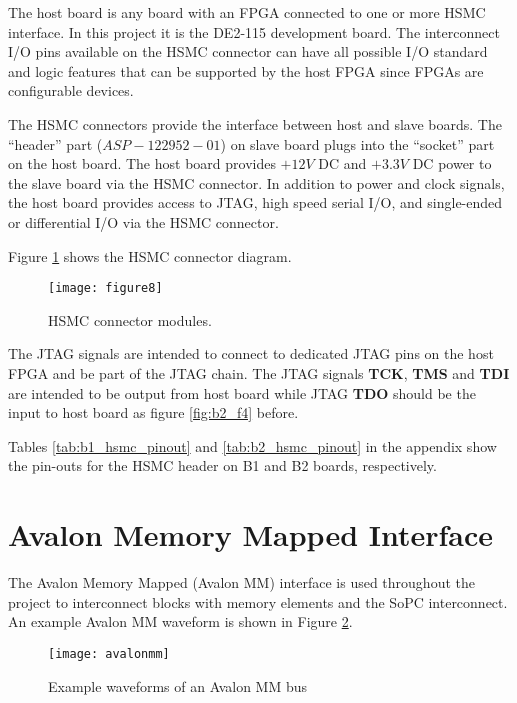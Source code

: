 The host board is any board with an FPGA connected to one or more HSMC interface. In this project it is the DE2-115 development board.
The interconnect I/O pins available on the HSMC connector can have all possible I/O standard and
logic features that can be supported by the host FPGA since FPGAs are configurable devices.

The HSMC connectors provide the interface between host and slave boards. The ``header''
part ($ASP-122952-01$) on slave board plugs into the ``socket'' part on the host board. The host
board provides $+12V$ DC and $+3.3V$ DC power to the slave board via the HSMC connector.
In addition to power and clock signals, the host board provides access to JTAG,
high speed serial I/O, and single-ended or differential I/O via the HSMC connector.

Figure \ref{fig:b2_f8} shows the HSMC connector diagram.

\begin{figure}
 \centering
 \texttt{[image: figure8]}
 \caption{HSMC connector modules.}
 \label{fig:b2_f8}
\end{figure}

The JTAG signals are intended to connect to dedicated JTAG pins on the host FPGA and
be part of the JTAG chain. The JTAG signals \textbf{TCK}, \textbf{TMS} and \textbf{TDI} are intended to be
output from host board while JTAG \textbf{TDO} should be the input to host board as figure \ref{fig:b2_f4} before.

Tables \ref{tab:b1_hsmc_pinout} and \ref{tab:b2_hsmc_pinout} in the appendix show the pin-outs for the HSMC header on B1 and B2 boards, respectively.












\newpage
\section{Avalon Memory Mapped Interface}
The Avalon Memory Mapped (Avalon MM) interface is used throughout the project to interconnect
blocks with memory elements and the SoPC interconnect. An example Avalon MM waveform
is shown in Figure \ref{figure:avalonmm}.
\begin{figure}[h!]
\begin{center}
\texttt{[image: avalonmm]}
\caption{Example waveforms of an Avalon MM bus}
\label{figure:avalonmm}
\end{center}
\end{figure}


